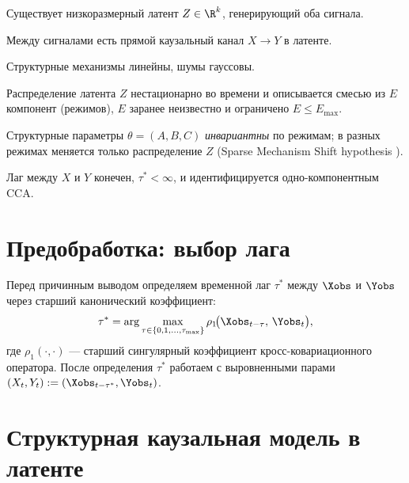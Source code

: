 \documentclass[a4paper,14pt]{article}
\renewcommand{\leq}{\ensuremath{\leqslant}}
\theoremstyle{plain} %
\theoremstyle{definition} %
\theoremstyle{remark} %
\begin{document}
\begin{assumption}\label{a:latent}
Существует низкоразмерный латент $Z \in \R^k$, генерирующий оба сигнала.
\end{assumption}
\begin{assumption}\label{a:direct}
Между сигналами есть прямой каузальный канал $X \to Y$ в латенте.
\end{assumption}
\begin{assumption}\label{a:linear}
Структурные механизмы линейны, шумы гауссовы.
\end{assumption}
\begin{assumption}\label{a:mixture}
Распределение латента $Z$ нестационарно во времени и описывается смесью из $E$ компонент (режимов), $E$ заранее неизвестно и ограничено $E \leq E_{\max}$.
\end{assumption}
\begin{assumption}\label{a:invariance}
Структурные параметры $\theta = (A, B, C)$ \emph{инвариантны} по режимам; в разных режимах меняется только распределение $Z$ (Sparse Mechanism Shift hypothesis \cite{scholkopf2021toward}).
\end{assumption}
\begin{assumption}\label{a:lag}
Лаг между $X$ и $Y$ конечен, $\tau^* < \infty$, и идентифицируется одно-компонентным CCA.
\end{assumption}

\section{Предобработка: выбор лага}

Перед причинным выводом определяем временной лаг $\tau^*$ между $\Xobs$ и $\Yobs$ через старший канонический коэффициент:
\begin{equation}
    \tau^* = \arg\max_{\tau \in \{0, 1, \dots, \tau_{\max}\}} \rho_1\!\big(\Xobs_{t-\tau},\, \Yobs_t\big),
\end{equation}
где $\rho_1(\cdot, \cdot)$ --- старший сингулярный коэффициент кросс-ковариационного оператора. После определения $\tau^*$ работаем с выровненными парами $(X_t, Y_t) := (\Xobs_{t-\tau^*}, \Yobs_t)$.

\section{Структурная каузальная модель в латенте}
\end{document}

